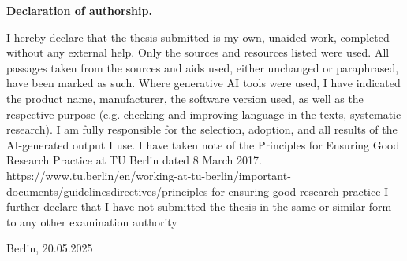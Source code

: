 \pagestyle{empty}
\vspace*{6cm}
{
\Large{ \bf Declaration of authorship.}\medskip

I hereby declare that the thesis submitted is my own, unaided work, completed without any external help. Only the sources and resources listed were used. 
All passages taken from the sources and aids used, either unchanged or paraphrased, have been marked as such. 
Where generative AI tools were used, I have indicated the product name, manufacturer, the software version 
used, as well as the respective purpose (e.g. checking and improving language in the texts, systematic 
research). 
I am fully responsible for the selection, adoption, and all results of the AI-generated output I use. 
I have taken note of the Principles for Ensuring Good Research Practice at TU Berlin dated 8 March 2017. 
https://www.tu.berlin/en/working-at-tu-berlin/important-documents/guidelinesdirectives/principles-for-ensuring-good-research-practice
I further declare that I have not submitted the thesis in the same or similar form to any other examination authority
\vspace{2cm}

Berlin, 20.05.2025
}
\vspace{3cm}

\hspace*{7cm}%

\hspace*{8.5cm}%